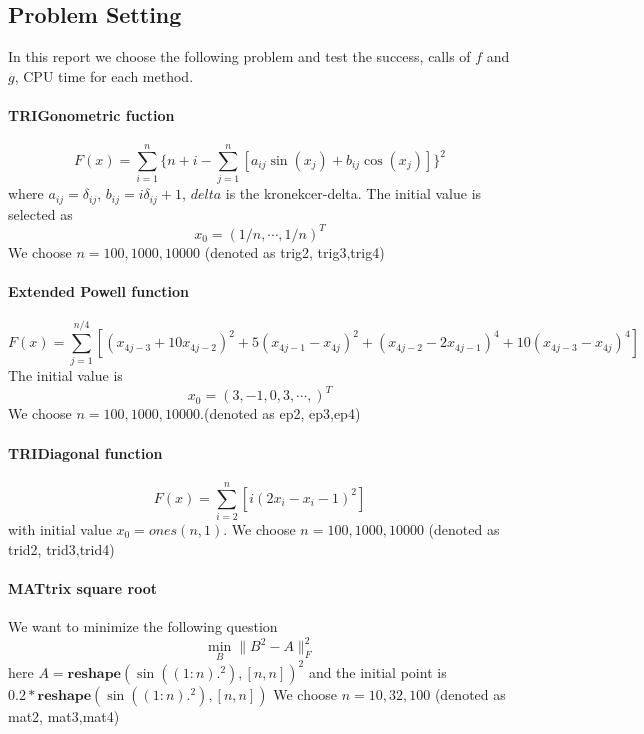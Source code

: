 \documentclass{article}
\begin{document}
\subsection{Problem Setting}
In this report we choose the following problem and test the success, calls of $f$ and $g$, CPU time for each method.

\paragraph{TRIGonometric fuction}
$$F(x) = \sum_{i=1}^n \{n+i-\sum_{j=1}^n[a_{ij}\sin(x_j)+b_{ij}\cos(x_j)]\}^2$$
where $a_{ij} = \delta_{ij}$, $b_{ij} = i\delta_{ij}+1$, $delta$ is the kronekcer-delta. 
The initial value is selected as $$x_0 = (1/n, \cdots, 1/n)^T$$
We choose $n = 100, 1000, 10000$ (denoted as trig2, trig3,trig4)
\paragraph{Extended Powell function}
$$F(x) = \sum_{j=1}^{n/4}[(x_{4j-3}+10x_{4j-2})^2  +5(x_{4j-1}-x_{4j})^2 + (x_{4j-2}-2x_{4j-1})^4 + 10(x_{4j-3}-x_{4j})^4]$$
The initial value is 
$$x_0 = (3, -1,0,3,\cdots, )^T$$
We choose $n=100, 1000,10000$.(denoted as ep2, ep3,ep4)
\paragraph{TRIDiagonal function}
$$F(x) = \sum_{i=2}^n[i(2x_i-x_i-1)^2]$$
with initial value $x_0 = ones(n,1)$. 
We choose $n=100,1000,10000$ (denoted as trid2, trid3,trid4)
\paragraph{MATtrix square root}
We want to minimize the following question
$$\min_{B} \|B^2-A\|_F^2$$
here $A = \textbf{reshape}(\sin((1:n).^2), [n,n])^2$
 and the initial point is $0.2*\textbf{reshape}(\sin((1:n).^2), [n,n])$
 We choose $n=10,32,100$ (denoted as mat2, mat3,mat4)
\end{document}
